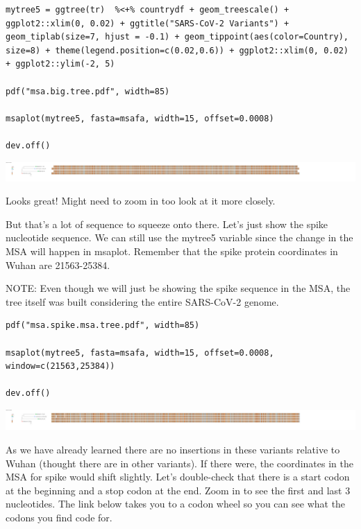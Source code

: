 \documentclass[
]{book}
\begin{document}
\begin{verbatim}
mytree5 = ggtree(tr)  %<+% countrydf + geom_treescale() + ggplot2::xlim(0, 0.02) + ggtitle("SARS-CoV-2 Variants") + geom_tiplab(size=7, hjust = -0.1) + geom_tippoint(aes(color=Country), size=8) + theme(legend.position=c(0.02,0.6)) + ggplot2::xlim(0, 0.02) + ggplot2::ylim(-2, 5)

pdf("msa.big.tree.pdf", width=85)

msaplot(mytree5, fasta=msafa, width=15, offset=0.0008)

dev.off()
\end{verbatim}

\includegraphics[width=1\textwidth,height=\textheight]{./Figures/msa.big.tree.png}

Looks great! Might need to zoom in too look at it more closely.

But that's a lot of sequence to squeeze onto there. Let's just show the spike nucleotide sequence. We can still use the mytree5 variable since the change in the MSA will happen in msaplot. Remember that the spike protein coordinates in Wuhan are 21563-25384.

NOTE: Even though we will just be showing the spike sequence in the MSA, the tree itself was built considering the entire SARS-CoV-2 genome.

\begin{verbatim}
pdf("msa.spike.msa.tree.pdf", width=85)

msaplot(mytree5, fasta=msafa, width=15, offset=0.0008, window=c(21563,25384))

dev.off()
\end{verbatim}

\includegraphics[width=1\textwidth,height=\textheight]{./Figures/msa.spike.msa.tree.png}

As we have already learned there are no insertions in these variants relative to Wuhan (thought there are in other variants). If there were, the coordinates in the MSA for spike would shift slightly. Let's double-check that there is a start codon at the beginning and a stop codon at the end. Zoom in to see the first and last 3 nucleotides. The link below takes you to a codon wheel so you can see what the codons you find code for.
\end{document}
